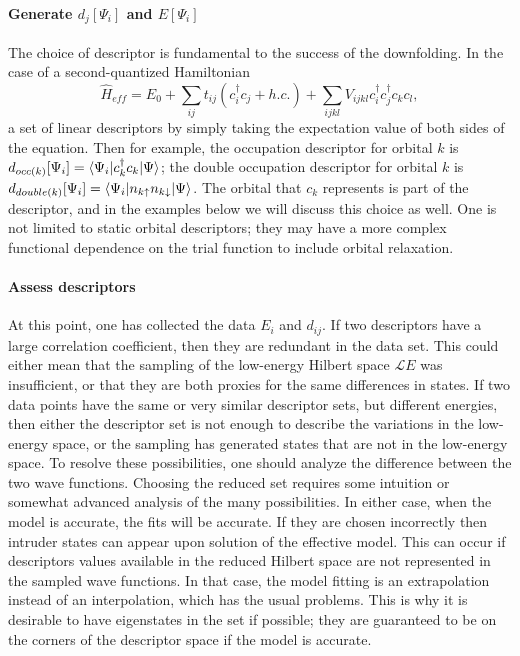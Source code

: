\paragraph{Generate $d_j[\Psi_i]$ and $E[\Psi_i]$} 
The choice of descriptor is fundamental to the success of the downfolding. 
In the case of a second-quantized Hamiltonian
\begin{equation}
\hat{H}_{eff} = E_0 + \sum_{ij} t_{ij} (c_i^\dagger c_j + h.c.) + \sum_{ijkl} V_{ijkl} c_i^\dagger c_j^\dagger c_k c_l,
\end{equation}
a set of linear descriptors by simply taking the expectation value of both sides of the equation. 
Then for example, the occupation descriptor for orbital $k$ is $d_{occ(k)}[\Psi_i] = \braket{\Psi_i | c_k^\dagger c_k | \Psi}$; the double occupation descriptor for orbital $k$ is $d_{double(k)}[\Psi_i] = \braket{\Psi_i | n_{k\uparrow}n_{k\downarrow} | \Psi}$. 
The orbital that $c_k$ represents is part of the descriptor, and in the examples below we will discuss this choice as well.
One is not limited to static orbital descriptors; they may have a more complex functional dependence on the trial function to include orbital relaxation.

 
\paragraph{Assess descriptors}
At this point, one has collected the data $E_i$ and $d_{ij}$. 
If two descriptors have a large correlation coefficient, then they are redundant in the data set. 
This could either mean that the sampling of the low-energy Hilbert space ${\mathcal LE}$ was insufficient, or that they are both proxies for the same differences in states. 
If two data points have the same or very similar descriptor sets, but different energies, then either the descriptor set is not enough to describe the variations in the low-energy space, or the sampling has generated states that are not in the low-energy space.
To resolve these possibilities, one should analyze the difference between the two wave functions.  
Choosing the reduced set requires some intuition or somewhat advanced analysis of the many possibilities. 
In either case, when the model is accurate, the fits will be accurate.
If they are chosen incorrectly then intruder states can appear upon solution of the effective model. 
This can occur if descriptors values available in the reduced Hilbert space are not represented in the sampled wave functions. 
In that case, the model fitting is an extrapolation instead of an interpolation, which has the usual problems.
This is why it is desirable to have eigenstates in the set if possible; they are guaranteed to be on the corners of the descriptor space if the model is accurate.


